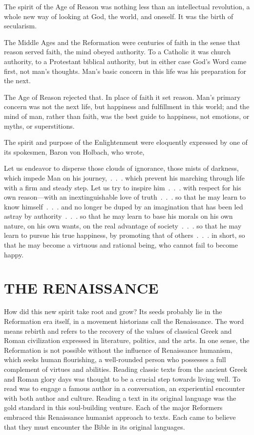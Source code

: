 The spirit of the Age of Reason was nothing less than an intellectual revolution, a whole new way of
looking at God, the world, and oneself. It was the birth of secularism.

The Middle Ages and the Reformation were centuries of faith in the sense that reason served faith,
the mind obeyed authority. To a Catholic it was church authority, to a Protestant biblical
authority, but in either case God’s Word came first, not man’s thoughts. Man’s basic concern in this
life was his preparation for the next.

The Age of Reason rejected that. In place of faith it set reason. Man’s primary concern was not the
next life, but happiness and fulfillment in this world; and the mind of man, rather than faith, was
the best guide to happiness, not emotions, or myths, or superstitions.

The spirit and purpose of the Enlightenment were eloquently expressed by one of its spokesmen, Baron
von Holbach, who wrote,

\begin{blockquote}
Let us endeavor to disperse those clouds of ignorance, those mists of darkness, which impede Man on
his journey,~.~.~. which prevent his marching through life with a firm and steady step. Let us try
to inspire him~.~.~. with respect for his own reason—with an inextinguishable love of truth~.~.~. so
that he may learn to know himself~.~.~. and no longer be duped by an imagination that has been led
astray by authority~.~.~. so that he may learn to base his morals on his own nature, on his own
wants, on the real advantage of society~.~.~. so that he may learn to pursue his true happiness, by
promoting that of others~.~.~. in short, so that he may become a virtuous and rational being, who
cannot fail to become happy.
\end{blockquote}

\section{THE RENAISSANCE}

How did this new spirit take root and grow? Its seeds probably lie in the Reformation era itself, in
a movement historians call the Renaissance. The word means rebirth and refers to the recovery of the
values of classical Greek and Roman civilization expressed in literature, politics, and the arts. In
one sense, the Reformation is not possible without the influence of Renaissance humanism, which
seeks human flourishing, a well-rounded person who possesses a full complement of virtues and
abilities. Reading classic texts from the ancient Greek and Roman glory days was thought to be a
crucial step towards living well. To read was to engage a famous author in a conversation, an
experiential encounter with both author and culture. Reading a text in its original language was the
gold standard in this soul-building venture. Each of the major Reformers embraced this Renaissance
humanist approach to texts. Each came to believe that they must encounter the Bible in its original
languages.

